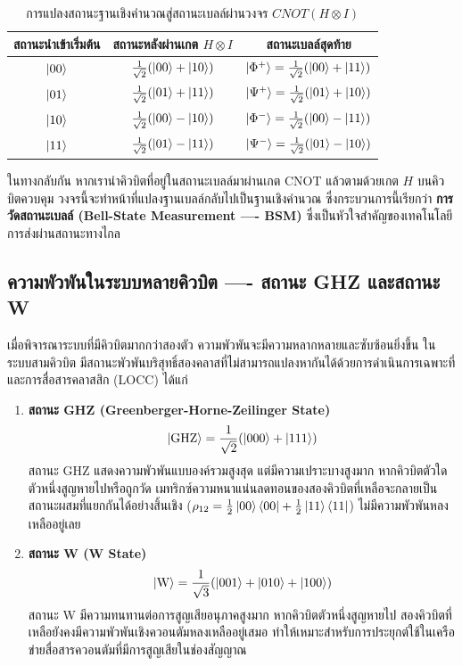 \begin{table}[H]
\centering
\caption{การแปลงสถานะฐานเชิงคำนวณสู่สถานะเบลล์ผ่านวงจร $CNOT(H \otimes I)$}
\label{tab:bell_generation_mapping}
\begin{tabular}{ccc}
\toprule
\textbf{สถานะนำเข้าเริ่มต้น} & \textbf{สถานะหลังผ่านเกต $H \otimes I$} & \textbf{สถานะเบลล์สุดท้าย} \\
\midrule
$\ket{00}$ & $\frac{1}{\sqrt{2}}(\ket{00} + \ket{10})$ & $\ket{\Phi^+} = \frac{1}{\sqrt{2}}(\ket{00} + \ket{11})$ \\
$\ket{01}$ & $\frac{1}{\sqrt{2}}(\ket{01} + \ket{11})$ & $\ket{\Psi^+} = \frac{1}{\sqrt{2}}(\ket{01} + \ket{10})$ \\
$\ket{10}$ & $\frac{1}{\sqrt{2}}(\ket{00} - \ket{10})$ & $\ket{\Phi^-} = \frac{1}{\sqrt{2}}(\ket{00} - \ket{11})$ \\
$\ket{11}$ & $\frac{1}{\sqrt{2}}(\ket{01} - \ket{11})$ & $\ket{\Psi^-} = \frac{1}{\sqrt{2}}(\ket{01} - \ket{10})$ \\
\bottomrule
\end{tabular}
\end{table}

ในทางกลับกัน หากเรานำคิวบิตที่อยู่ในสถานะเบลล์มาผ่านเกต CNOT แล้วตามด้วยเกต $H$ บนคิวบิตควบคุม วงจรนี้จะทำหน้าที่แปลงฐานเบลล์กลับไปเป็นฐานเชิงคำนวณ ซึ่งกระบวนการนี้เรียกว่า \textbf{การวัดสถานะเบลล์ (Bell-State Measurement ---- BSM)} ซึ่งเป็นหัวใจสำคัญของเทคโนโลยีการส่งผ่านสถานะทางไกล

\subsection{ความพัวพันในระบบหลายคิวบิต ---- สถานะ GHZ และสถานะ W}
เมื่อพิจารณาระบบที่มีคิวบิตมากกว่าสองตัว ความพัวพันจะมีความหลากหลายและซับซ้อนยิ่งขึ้น ในระบบสามคิวบิต มีสถานะพัวพันบริสุทธิ์สองคลาสที่ไม่สามารถแปลงหากันได้ด้วยการดำเนินการเฉพาะที่และการสื่อสารคลาสสิก (LOCC) ได้แก่

\begin{enumerate}
    \item \textbf{สถานะ GHZ (Greenberger-Horne-Zeilinger State)}
    \begin{equation}
    \ket{\text{GHZ}} = \frac{1}{\sqrt{2}} (\ket{000} + \ket{111})
    \label{eq:ghz_state}
    \end{equation}
    สถานะ GHZ แสดงความพัวพันแบบองค์รวมสูงสุด แต่มีความเปราะบางสูงมาก หากคิวบิตตัวใดตัวหนึ่งสูญหายไปหรือถูกวัด เมทริกซ์ความหนาแน่นลดทอนของสองคิวบิตที่เหลือจะกลายเป็นสถานะผสมที่แยกกันได้อย่างสิ้นเชิง ($\rho_{12} = \frac{1}{2}\ket{00}\bra{00} + \frac{1}{2}\ket{11}\bra{11}$) ไม่มีความพัวพันหลงเหลืออยู่เลย
    \item \textbf{สถานะ W (W State)}
    \begin{equation}
    \ket{\text{W}} = \frac{1}{\sqrt{3}} (\ket{001} + \ket{010} + \ket{100})
    \label{eq:w_state}
    \end{equation}
    สถานะ W มีความทนทานต่อการสูญเสียอนุภาคสูงมาก หากคิวบิตตัวหนึ่งสูญหายไป สองคิวบิตที่เหลือยังคงมีความพัวพันเชิงควอนตัมหลงเหลืออยู่เสมอ ทำให้เหมาะสำหรับการประยุกต์ใช้ในเครือข่ายสื่อสารควอนตัมที่มีการสูญเสียในช่องสัญญาณ
\end{enumerate}

